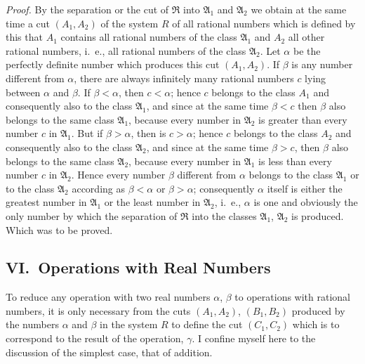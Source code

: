 \documentclass[polutonikogreek,english,twoside,openright]{article}
\begin{document}
\textit{Proof.} By the separation or the cut of $\mathfrak{R}$ into
$\mathfrak{A}_1$ and $\mathfrak{A}_2$ we obtain at the same time a cut
$(A_1, A_2)$ of the system $R$ of all rational numbers which is
defined by this that $A_1$ contains all rational numbers of the class
$\mathfrak{A}_1$ and $A_2$ all other rational numbers, i.~e., all
rational numbers of the class $\mathfrak{A}_2$. Let $\alpha$ be the
perfectly definite number which produces this cut $(A_1, A_2)$. If
$\beta$ is any number different from $\alpha$, there are always
infinitely many rational numbers $c$ lying between $\alpha$ and
$\beta$. If $\beta<\alpha$, then $c<\alpha$; hence $c$ belongs to the
class $A_1$ and consequently also to the class $\mathfrak{A}_1$, and
since at the same time $\beta<c$ then $\beta$ also belongs to the same
class $\mathfrak{A}_1$, because every number in $\mathfrak{A}_2$ is
greater than every number $c$ in $\mathfrak{A}_1$. But if
$\beta>\alpha$, then is $c>\alpha$; hence $c$ belongs to the class
$A_2$ and consequently also to the class $\mathfrak{A}_2$, and since
at the same time $\beta>c$, then $\beta$ also belongs to the same
class $\mathfrak{A}_2$, because every number in $\mathfrak{A}_1$ is
less than every number $c$ in $\mathfrak{A}_2$. Hence every number
$\beta$ different from $\alpha$ belongs to the class $\mathfrak{A}_1$
or to the class $\mathfrak{A}_2$ according as $\beta<\alpha$ or
$\beta>\alpha$; consequently $\alpha$ itself is either the greatest
number in $\mathfrak{A}_1$ or the least number in $\mathfrak{A}_2$,
i.~e., $\alpha$ is one and obviously the only number by which the
separation of $\mathfrak{R}$ into the classes $\mathfrak{A}_1$,
$\mathfrak{A}_2$ is produced. Which was to be proved.

\subsection*{VI.\ Operations with Real Numbers}
\label{EISVI}

To reduce any operation with two real numbers $\alpha$, $\beta$ to
operations with rational numbers, it is only necessary from the cuts
$(A_1, A_2)$, $(B_1, B_2)$ produced by the numbers $\alpha$ and
$\beta$ in the system $R$ to define the cut $(C_1, C_2)$ which is to
correspond to the result of the operation, $\gamma$. I confine myself
here to the discussion of the simplest case, that of addition.
\end{document}
